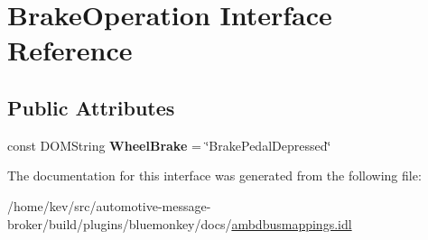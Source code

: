 \hypertarget{interfaceBrakeOperation}{\section{Brake\+Operation Interface Reference}
\label{interfaceBrakeOperation}
}
\subsection*{Public Attributes}
\begin{DoxyCompactItemize}
\item 
\hypertarget{interfaceBrakeOperation_ad73cf8b7d7f23278303ecdbeaeb7a62b}{const D\+O\+M\+String {\bfseries Wheel\+Brake} = \char`\"{}Brake\+Pedal\+Depressed\char`\"{}}\label{interfaceBrakeOperation_ad73cf8b7d7f23278303ecdbeaeb7a62b}

\end{DoxyCompactItemize}


The documentation for this interface was generated from the following file\+:\begin{DoxyCompactItemize}
\item 
/home/kev/src/automotive-\/message-\/broker/build/plugins/bluemonkey/docs/\hyperlink{ambdbusmappings_8idl}{ambdbusmappings.\+idl}\end{DoxyCompactItemize}
